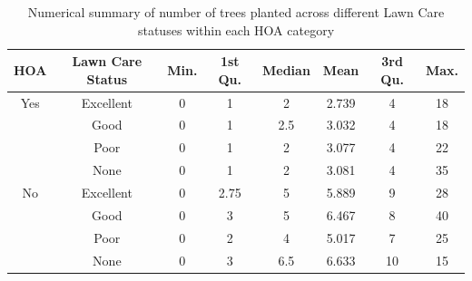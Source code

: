 \documentclass{article}
\begin{document}
\begin{table}[H]
  \centering
    \begin{tabular}{|c|c|c|c|c|c|c|c|}\hline
    HOA &
    Lawn Care Status 
    & Min. & 1st Qu. & Median & Mean & 3rd Qu. & Max. \\\hline\hline
    
    Yes & Excellent &
    0 & 1 & 
    2 & 
    2.739 & 4 & 18\\\hline\hline
    
    & Good &
    0 & 1 & 
    2.5 & 
    3.032 & 4 & 18\\\hline\hline
    
    & Poor &
    0 & 1 & 
    2 & 
    3.077 & 4 & 22 \\\hline\hline
    
    & None &
    0 & 1 & 
    2 & 
    3.081 & 4 & 35\\\hline\hline
    
   No & Excellent &
    0 & 2.75 & 
    5 & 
    5.889 & 9 & 28\\\hline\hline
    
    & Good &
    0 & 3 & 
    5 & 
    6.467 & 8 & 40\\\hline\hline
    
    & Poor &
    0 & 2 & 
    4 & 
    5.017 & 7 & 25 \\\hline\hline
    
    & None &
    0 & 3 & 
    6.5 & 
    6.633 & 10 & 15\\\hline\hline
    
    \end{tabular}
    \caption{Numerical summary of number of trees planted across different Lawn Care statuses within each HOA category}
  \end{table}
\end{document}
